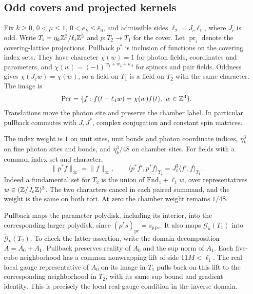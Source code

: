 \subsection{Odd covers and projected kernels}
\label{subsec:rgcov-projection}

Fix $k\ge0$, $0<\mu\le1$, $0<e_k\le\bar e_0$, and admissible
sides $\ell_2=J_c\ell_1$, where $J_c$ is odd.
Write $T_i=\eta_k\mathbb Z^3/\ell_i\mathbb Z^3$ and
$p:T_2\to T_1$ for the cover. Let
$\operatorname{pr}_i$ denote the covering-lattice projections.
Pullback $p^*$ is inclusion of functions on the covering
index sets. They have character
$\chi(w)=1$ for photon fields, coordinates and parameters,
and $\chi(w)=(-1)^{w_1+w_2+w_3}$ for spinors and pair
fields. Oddness gives
$\chi(J_cw)=\chi(w)$, so a field on $T_1$ is a field
on $T_2$ with the same character.
The image is
\[
 \mathrm{Per}=\{f:f(t+\ell_1w)=\chi(w)f(t),\ w\in\Z^3\}.
\]
Translations move the photon site and preserve the chamber
label. In particular pullback commutes with $J,J^*$,
complex conjugation and constant spin matrices.

The index weight is $1$ on unit sites, unit bonds and
photon coordinate indices, $\eta_k^3$ on fine photon
sites and bonds, and $\eta_k^3/48$ on chamber sites.
For fields with a common index set and character,
\begin{equation}\label{eq:rgcov-pullback-pairing}
 \|p^*f\|_\infty=\|f\|_\infty,\qquad
 \langle p^*f',p^*f\rangle_{T_2}
                                      =J_c^3\langle f',f\rangle_{T_1}.
\end{equation}
Indeed a fundamental set for $T_2$ is the union of
$\mathrm{Fnd}_1+\ell_1w$, over representatives
$w\in(\mathbb Z/J_c\mathbb Z)^3$. The two characters cancel in
each paired summand, and the weight is the same on both
tori. At zero the chamber weight remains $1/48$.

Pullback maps the parameter polydisk, including its interior,
into the corresponding larger polydisk, since
$(p^*s)_{\mathrm{pc}}=s_{p\,\mathrm{pc}}$.
It also maps
$\widetilde{\mathcal G}_k(T_1)$ into
$\widetilde{\mathcal G}_k(T_2)$.
To check the latter assertion, write the domain decomposition
$A=A_0+A_1$. Pullback preserves reality of $A_0$ and
the sup norm of $A_1$. Each five-cube neighborhood has
a common nonwrapping lift of side $11M<\ell_1$.
The real local gauge representative of $A_0$ on its
image in $T_1$ pulls back on this lift to the
corresponding neighborhood in $T_2$, with its same
sup bound and gradient identity. This is precisely
the local real-gauge condition in the inverse domain.

